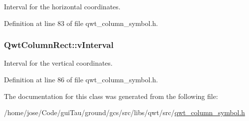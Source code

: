 Interval for the horizontal coordinates. 



Definition at line 83 of file qwt\-\_\-column\-\_\-symbol.\-h.

\hypertarget{class_qwt_column_rect_a0dcd7826655c73da74a8f9ad87f3d62a}{
\subsubsection[{v\-Interval}]{ Qwt\-Column\-Rect\-::v\-Interval}}\label{class_qwt_column_rect_a0dcd7826655c73da74a8f9ad87f3d62a}


Interval for the vertical coordinates. 



Definition at line 86 of file qwt\-\_\-column\-\_\-symbol.\-h.



The documentation for this class was generated from the following file\-:\begin{DoxyCompactItemize}
\item 
/home/jose/\-Code/gui\-Tau/ground/gcs/src/libs/qwt/src/\hyperlink{qwt__column__symbol_8h}{qwt\-\_\-column\-\_\-symbol.\-h}\end{DoxyCompactItemize}

